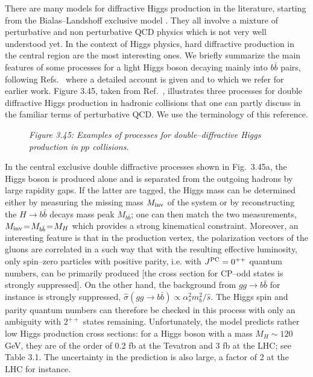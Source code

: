 There are many models for diffractive Higgs production in the literature,
starting from the Bialas--Landshoff exclusive model \cite{BL-diffr}.  They all
involve a mixture of perturbative and non perturbative QCD physics which is not
very well understood yet.  In the context of Higgs physics, hard diffractive
production in the central region are the most interesting ones. We briefly
summarize the main features of some processes for a light Higgs boson decaying
mainly into $b\bar b$ pairs, following Refs.~\cite{Valery-myths,diffr-Houches}
where a detailed account is given and to which we refer for earlier work. 
Figure 3.45, taken from Ref.~\cite{Valery-myths}, illustrates three processes
for double diffractive Higgs production in hadronic collisions that one can
partly discuss in the familiar terms of perturbative QCD. We use the
terminology of this reference.\s

\begin{figure}[h]
\vspace*{-2mm}
\begin{center}
\end{center}
\vspace{-.2cm}
{\it Figure 3.45: Examples of processes for double--diffractive Higgs 
production in $pp$ collisions.}
\vspace{-.3cm}
\end{figure}

In the central exclusive double diffractive processes shown in Fig.~3.45a, the
Higgs boson is produced alone and is separated from the outgoing hadrons by
large rapidity gaps. If the latter are tagged, the Higgs mass can be determined
either by measuring the missing mass $M_{\rm inv}$ of the system or by
reconstructing the $H\to b\bar b$ decays mass peak $M_{b\bar b}$; one can then
match the two measurements, $M_{\rm inv}\!=\!M_{b \bar b}\!=\!M_H$ which
provides a strong kinematical constraint.  Moreover, an interesting feature is
that in the production vertex, the polarization vectors of the gluons are
correlated in a such way that with the resulting effective luminosity, only
spin--zero particles with positive parity, i.e. with $J^{\rm PC}=0^{++}$
quantum numbers, can be primarily produced [the cross section for CP--odd
states is strongly suppressed]. On the other hand, the background
from $gg \to b\bar b$ for instance is strongly suppressed, $\hat \sigma (gg \to
b\bar b) \propto \alpha_s^2 m_b^2/\hat s$.  The Higgs spin and parity quantum 
numbers can therefore be checked in this process \cite{diff-spin}
with only an ambiguity with $2^{++}$ states remaining.  Unfortunately, the model
predicts rather low Higgs production cross sections: for a Higgs boson with a
mass $M_H \sim 120$ GeV, they are of the order of 0.2 fb at the Tevatron and 3
fb at the LHC; see Table 3.1. The uncertainty in the prediction is also large,
a factor of 2 at the LHC for instance.\s


